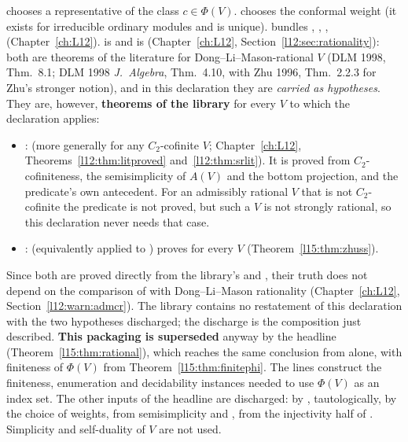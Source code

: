 \begin{dictionary}
 chooses a representative of the class $c\in\Phi(V)$.  chooses the conformal weight
(it exists for irreducible ordinary modules and is unique).  bundles
, , ,  (Chapter~\ref{ch:L12}).
 is  and  is
 (Chapter~\ref{ch:L12}, Section~\ref{l12:sec:rationality}): both are
theorems of the literature for Dong--Li--Mason-rational $V$ (DLM 1998, Thm.~8.1; DLM 1998 \emph{J.~Algebra}, Thm.~4.10,
with Zhu 1996, Thm.~2.2.3 for Zhu's stronger notion), and in this declaration they are \emph{carried as hypotheses}. They
are, however, \textbf{theorems of the library} for every $V$ to which the declaration applies:
\begin{itemize}
\item {}:  (more generally
   for any $C_2$-cofinite $V$; Chapter~\ref{ch:L12},
  Theorems~\ref{l12:thm:litproved} and~\ref{l12:thm:srlit}). It is proved from $C_2$-cofiniteness, the semisimplicity of
  $A(V)$ and the bottom projection, and the predicate's own  antecedent. For an admissibly rational
  $V$ that is not $C_2$-cofinite the predicate is not proved, but such a $V$ is not strongly rational, so this declaration
  never needs that case.
\item {}:  (equivalently  applied to
  ) proves  for every $V$ (Theorem~\ref{l15:thm:zhuss}).
\end{itemize}
Since both are proved directly from the library's  and , their truth does not depend
on the comparison of  with Dong--Li--Mason rationality (Chapter~\ref{ch:L12},
Section~\ref{l12:warn:admcr}). The library contains no restatement of this declaration with the two hypotheses discharged;
the discharge is the composition just described. \textbf{This packaging is superseded} anyway by the headline
\allowbreak{}\allowbreak{} (Theorem~\ref{l15:thm:rational}), which
reaches the same conclusion from  alone, with finiteness of $\Phi(V)$ from Theorem~\ref{l15:thm:finitephi}. The  lines construct the finiteness, enumeration and decidability instances needed to use
$\Phi(V)$ as an index set. The other inputs of the headline are discharged:  by ,
 tautologically,  by the choice of weights,  from semisimplicity and , 
from the injectivity half of . Simplicity and self-duality of $V$ are not used.
\end{dictionary}

